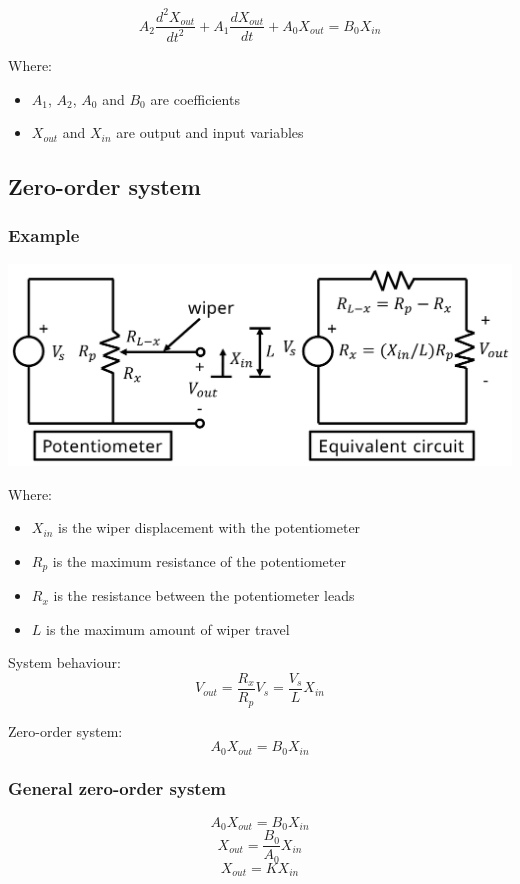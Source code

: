 \documentclass[11pt]{article}
\begin{document}
\[A_2 \frac{d^2 X_{out}}{dt^2} + A_1 \frac{d X_{out}}{dt} + A_0 X_{out} = B_0 X_{in}\]

Where:
\begin{itemize}
\item \(A_1\), \(A_2\), \(A_0\) and \(B_0\) are coefficients
\item \(X_{out}\) and \(X_{in}\) are output and input variables
\end{itemize}
\subsection{Zero-order system}
\label{sec:org1b36582}

\subsubsection{Example}
\label{sec:orgf4e428e}
\begin{center}
\includegraphics[width=.9\linewidth]{./images/linear-potentiometer-used-as-position-sensor.png}
\end{center}

Where:
\begin{itemize}
\item \(X_{in}\) is the wiper displacement with the potentiometer
\item \(R_p\) is the maximum resistance of the potentiometer
\item \(R_x\) is the resistance between the potentiometer leads
\item \(L\) is the maximum amount of wiper travel
\end{itemize}

System behaviour:
\[V_{out} = \frac{R_x}{R_p} V_s = \frac{V_s}{L} X_{in}\]

Zero-order system:
\[A_0 X_{out} = B_0 X_{in}\]
\subsubsection{General zero-order system}
\label{sec:org016501b}
\[A_0 X_{out} = B_0 X_{in}\]
\[X_{out} = \frac{B_0}{A_0} X_{in}\]
\[X_{out} = K X_{in}\]
\end{document}
